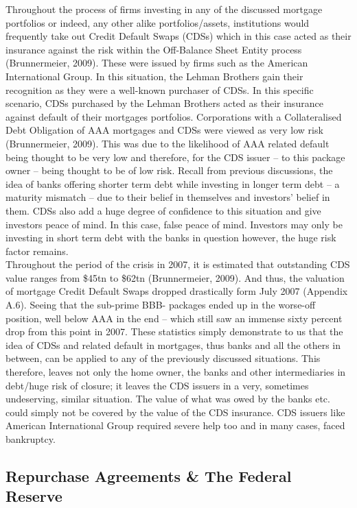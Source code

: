 \documentclass[11pt, english]{article}
\begin{document}
	Throughout the process of firms investing in any of the discussed mortgage portfolios or indeed, any other alike portfolios/assets, institutions would frequently take out Credit Default Swaps (CDSs) which in this case acted as their insurance against the risk within the Off-Balance Sheet Entity process (Brunnermeier, 2009). These were issued by firms such as the American International Group. In this situation, the Lehman Brothers gain their recognition as they were a well-known purchaser of CDSs. In this specific scenario, CDSs purchased by the Lehman Brothers acted as their insurance against default of their mortgages portfolios. Corporations with a Collateralised Debt Obligation of AAA mortgages and CDSs were viewed as very low risk (Brunnermeier, 2009). This was due to the likelihood of AAA related default being thought to be very low and therefore, for the CDS issuer – to this package owner – being thought to be of low risk. Recall from previous discussions, the idea of banks offering shorter term debt while investing in longer term debt – a maturity mismatch – due to their belief in themselves and investors’ belief in them. CDSs also add a huge degree of confidence to this situation and give investors peace of mind. In this case, false peace of mind. Investors may only be investing in short term debt with the banks in question however, the huge risk factor remains.\\

	Throughout the period of the crisis in 2007, it is estimated that outstanding CDS value ranges from \$45tn to \$62tn (Brunnermeier, 2009). And thus, the valuation of mortgage Credit Default Swaps dropped drastically form July 2007 (Appendix A.6). Seeing that the sub-prime BBB- packages ended up in the worse-off position, well below AAA in the end – which still saw an immense sixty percent drop from this point in 2007. These statistics simply demonstrate to us that the idea of CDSs and related default in mortgages, thus banks and all the others in between, can be applied to any of the previously discussed situations. This therefore, leaves not only the home owner, the banks and other intermediaries in debt/huge risk of closure; it leaves the CDS issuers in a very, sometimes undeserving, similar situation. The value of what was owed by the banks etc. could simply not be covered by the value of the CDS insurance. CDS issuers like American International Group required severe help too and in many cases, faced bankruptcy.

	\subsection{Repurchase Agreements \& The Federal Reserve}
\end{document}
